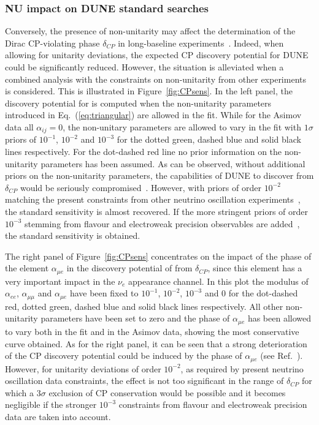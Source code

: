 \subsubsection{NU impact on DUNE standard searches}
Conversely, the presence of non-unitarity may affect the determination of the
Dirac CP-violating phase $\delta_{CP}$ in long-baseline experiments~\cite{Miranda:2016wdr,Fernandez-Martinez:2016lgt,Escrihuela:2016ube}.
 Indeed, when allowing for unitarity deviations, the expected CP discovery potential for DUNE could be significantly reduced.
However, the situation is alleviated when a combined analysis with the constraints on non-unitarity from other experiments is considered. This is illustrated in Figure~\ref{fig:CPsens}. In the left panel, the discovery potential for  is computed when the non-unitarity parameters introduced in Eq.~(\ref{eq:triangular}) are allowed in the fit. While for the Asimov data all $\alpha_{ij}=0$, the non-unitary parameters are allowed to vary in the fit with $1 \sigma$ priors of $10^{-1}$, $10^{-2}$ and $10^{-3}$ for the dotted green, dashed blue and solid black lines respectively. For the dot-dashed red line no prior information on the non-unitarity parameters has been assumed. As can be observed, without additional priors on the non-unitarity parameters, the capabilities of DUNE to discover  from $\delta_{CP}$ would be seriously compromised~\cite{Escrihuela:2016ube}. However, with priors of order $10^{-2}$ matching the present constraints from other neutrino oscillation experiments~\cite{Escrihuela:2016ube,Blennow:2016jkn}, the standard sensitivity is almost recovered. If the more stringent priors of order $10^{-3}$ stemming from flavour and electroweak precision observables are added~\cite{Antusch:2014woa,Fernandez-Martinez:2016lgt}, the standard sensitivity is obtained.   

The right panel of Figure~\ref{fig:CPsens} concentrates on the impact of the phase of the element $\alpha_{\mu e}$ in the discovery potential of  from $\delta_{CP}$, since this element has a very important impact in the $\nu_e$ appearance channel. In this plot the modulus of $\alpha_{ee}$, $\alpha_{\mu \mu}$ and $\alpha_{\mu e}$ have been fixed to $10^{-1}$, $10^{-2}$, $10^{-3}$ and 0 for the dot-dashed red, dotted green, dashed blue and solid black lines respectively. All other non-unitarity parameters have been set to zero and the phase of $\alpha_{\mu e}$ has been allowed to vary both in the fit and in the Asimov data, showing the most conservative curve obtained. As for the right panel, it can be seen that a strong deterioration of the CP discovery potential could be induced by the phase of $\alpha_{\mu e}$ (see Ref.~\cite{Escrihuela:2016ube}). However, for unitarity deviations of order $10^{-2}$, as required by present neutrino oscillation data constraints, the effect is not too significant in the range of $\delta_{CP}$ for which a $3 \sigma$ exclusion of CP conservation would be possible and it becomes negligible if the stronger $10^{-3}$ constraints from flavour and electroweak precision data are taken into account.  

